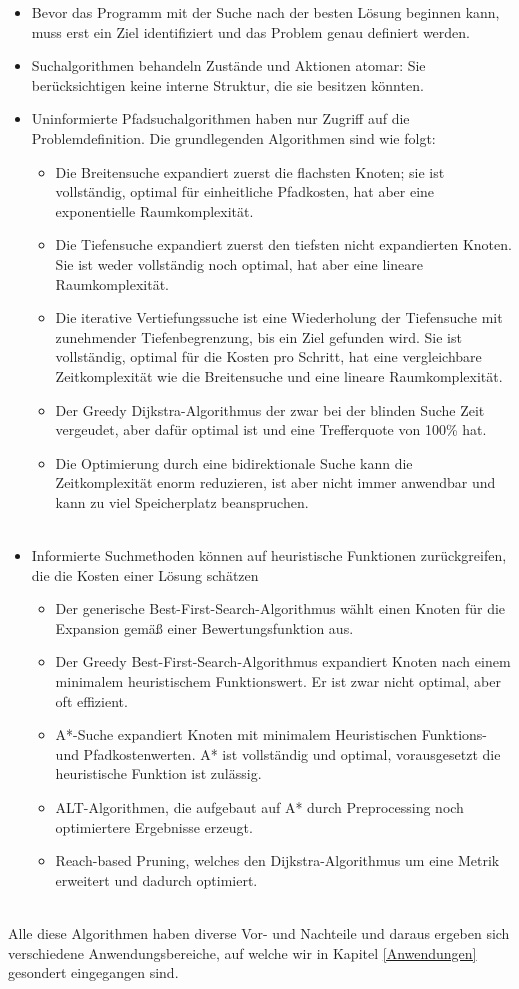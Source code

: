 \begin{itemize}
    \item Bevor das Programm mit der Suche nach der besten Lösung beginnen kann, muss erst ein Ziel identifiziert und das Problem genau definiert werden.
    \item Suchalgorithmen behandeln Zustände und Aktionen atomar: Sie berücksichtigen keine interne Struktur, die sie besitzen könnten.
    \item Uninformierte Pfadsuchalgorithmen haben nur Zugriff auf die Problemdefinition. Die grundlegenden Algorithmen sind wie folgt:
    \begin{itemize}
        \item Die Breitensuche expandiert zuerst die flachsten Knoten; sie ist vollständig, optimal für einheitliche Pfadkosten, hat aber eine exponentielle Raumkomplexität.
        \item Die Tiefensuche expandiert zuerst den tiefsten nicht expandierten Knoten. Sie ist weder vollständig noch optimal, hat aber eine lineare Raumkomplexität.
        \item Die iterative Vertiefungssuche ist eine Wiederholung der Tiefensuche mit zunehmender Tiefenbegrenzung, bis ein Ziel gefunden wird. Sie ist vollständig, optimal für die Kosten pro Schritt, hat eine vergleichbare Zeitkomplexität wie die Breitensuche und eine lineare Raumkomplexität.
        \item Der Greedy Dijkstra-Algorithmus der zwar bei der blinden Suche Zeit vergeudet, aber dafür optimal ist und eine Trefferquote von 100\% hat.
        \item Die Optimierung durch eine bidirektionale Suche kann die Zeitkomplexität enorm reduzieren, ist aber nicht immer anwendbar und kann zu viel Speicherplatz beanspruchen.\\\\
    \end{itemize}
    \item Informierte Suchmethoden können auf heuristische Funktionen zurückgreifen, die die Kosten einer Lösung schätzen
    \begin{itemize}
        \item Der generische Best-First-Search-Algorithmus wählt einen Knoten für die Expansion gemäß einer Bewertungsfunktion aus.
        \item Der Greedy Best-First-Search-Algorithmus expandiert Knoten nach einem minimalem heuristischem Funktionswert. Er ist zwar nicht optimal, aber oft effizient.
        \item A*-Suche expandiert Knoten mit minimalem Heuristischen Funktions- und Pfadkostenwerten. A* ist vollständig und optimal, vorausgesetzt die heuristische Funktion ist zulässig.
        \item ALT-Algorithmen, die aufgebaut auf A* durch Preprocessing noch optimiertere Ergebnisse erzeugt.
        \item Reach-based Pruning, welches den Dijkstra-Algorithmus um eine Metrik erweitert und dadurch optimiert.
    \end{itemize}
\end{itemize}
\cite{Russell:10d}
\noindent \\
Alle diese Algorithmen haben diverse Vor- und Nachteile und daraus ergeben sich verschiedene 
Anwendungsbereiche, auf welche wir in Kapitel \ref*{Anwendungen} gesondert eingegangen sind.
